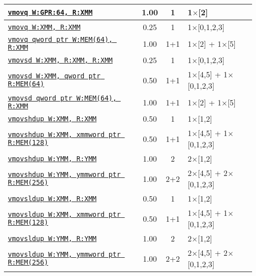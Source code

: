 \documentclass[a4paper,english,fontsize=9]{scrartcl}
\begin{document}
\begin{longtable}{p{}ccL{.25\textwidth}}
  \midrule
  \texttt{\href{https://felixcloutier.com/x86/MOVD:MOVQ.html}{vmovq W:GPR:64, R:XMM}} & 1.00 & 1 & 1\(\times\)[2] \\
  \midrule
  \texttt{\href{https://felixcloutier.com/x86/MOVQ.html}{vmovq W:XMM, R:XMM}} & 0.25 & 1 & 1\(\times\)[0,1,2,3] \\
  \midrule
  \texttt{\href{https://felixcloutier.com/x86/MOVQ.html}{vmovq qword ptr W:MEM(64), R:XMM}} & 1.00 & 1+1 & 1\(\times\)[2] + 1\(\times\)[5] \\
  \midrule
  \texttt{\href{https://felixcloutier.com/x86/MOVSD.html}{vmovsd W:XMM, R:XMM, R:XMM}} & 0.25 & 1 & 1\(\times\)[0,1,2,3] \\
  \midrule
  \texttt{\href{https://felixcloutier.com/x86/MOVSD.html}{vmovsd W:XMM, qword ptr R:MEM(64)}} & 0.50 & 1+1 & 1\(\times\)[4,5] + 1\(\times\)[0,1,2,3] \\
  \midrule
  \texttt{\href{https://felixcloutier.com/x86/MOVSD.html}{vmovsd qword ptr W:MEM(64), R:XMM}} & 1.00 & 1+1 & 1\(\times\)[2] + 1\(\times\)[5] \\
  \midrule
  \texttt{\href{https://felixcloutier.com/x86/MOVSHDUP.html}{vmovshdup W:XMM, R:XMM}} & 0.50 & 1 & 1\(\times\)[1,2] \\
  \midrule
  \texttt{\href{https://felixcloutier.com/x86/MOVSHDUP.html}{vmovshdup W:XMM, xmmword ptr R:MEM(128)}} & 0.50 & 1+1 & 1\(\times\)[4,5] + 1\(\times\)[0,1,2,3] \\
  \midrule
  \texttt{\href{https://felixcloutier.com/x86/MOVSHDUP.html}{vmovshdup W:YMM, R:YMM}} & 1.00 & 2 & 2\(\times\)[1,2] \\
  \midrule
  \texttt{\href{https://felixcloutier.com/x86/MOVSHDUP.html}{vmovshdup W:YMM, ymmword ptr R:MEM(256)}} & 1.00 & 2+2 & 2\(\times\)[4,5] + 2\(\times\)[0,1,2,3] \\
  \midrule
  \texttt{\href{https://felixcloutier.com/x86/MOVSLDUP.html}{vmovsldup W:XMM, R:XMM}} & 0.50 & 1 & 1\(\times\)[1,2] \\
  \midrule
  \texttt{\href{https://felixcloutier.com/x86/MOVSLDUP.html}{vmovsldup W:XMM, xmmword ptr R:MEM(128)}} & 0.50 & 1+1 & 1\(\times\)[4,5] + 1\(\times\)[0,1,2,3] \\
  \midrule
  \texttt{\href{https://felixcloutier.com/x86/MOVSLDUP.html}{vmovsldup W:YMM, R:YMM}} & 1.00 & 2 & 2\(\times\)[1,2] \\
  \midrule
  \texttt{\href{https://felixcloutier.com/x86/MOVSLDUP.html}{vmovsldup W:YMM, ymmword ptr R:MEM(256)}} & 1.00 & 2+2 & 2\(\times\)[4,5] + 2\(\times\)[0,1,2,3] \\

\end{longtable}
\end{document}
